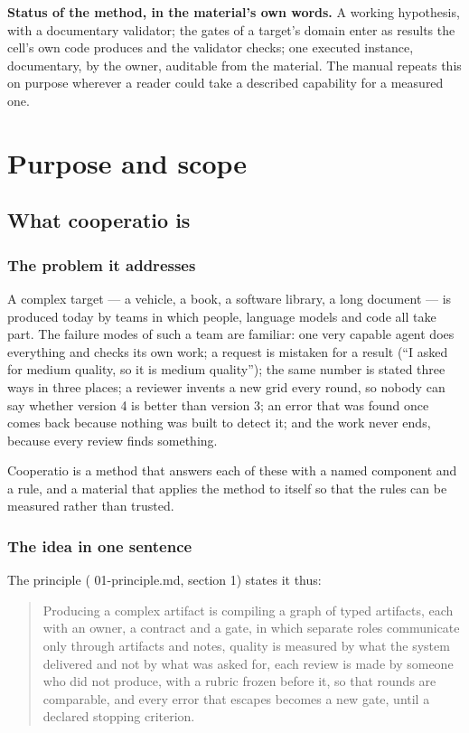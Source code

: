 \documentclass[
  american,
  10pt,
]{report}
\renewcommand{\texttt}[1]{{\ttfamily\hyphenchar\font=-1 #1}}
\begin{document}
\textbf{Status of the method, in the material's own words.} A working
hypothesis, with a documentary validator; the gates of a target's domain
enter as results the cell's own code produces and the validator checks;
one executed instance, documentary, by the owner, auditable from the
material. The manual repeats this on purpose wherever a reader could
take a described capability for a measured one.

\part{Purpose and scope}

\chapter{What cooperatio is}\label{what-cooperatio-is}

\section{The problem it addresses}\label{the-problem-it-addresses}

A complex target --- a vehicle, a book, a software library, a long
document --- is produced today by teams in which people, language models
and code all take part. The failure modes of such a team are familiar:
one very capable agent does everything and checks its own work; a
request is mistaken for a result (``I asked for medium quality, so it is
medium quality''); the same number is stated three ways in three places;
a reviewer invents a new grid every round, so nobody can say whether
version 4 is better than version 3; an error that was found once comes
back because nothing was built to detect it; and the work never ends,
because every review finds something.

Cooperatio is a method that answers each of these with a named component
and a rule, and a material that applies the method to itself so that the
rules can be measured rather than trusted.

\section{The idea in one sentence}\label{the-idea-in-one-sentence}

The principle (\texttt{01-\allowbreak{}principle.\allowbreak{}md},
section 1) states it thus:

\begin{quote}
Producing a complex artifact is compiling a graph of typed artifacts,
each with an owner, a contract and a gate, in which separate roles
communicate only through artifacts and notes, quality is measured by
what the system delivered and not by what was asked for, each review is
made by someone who did not produce, with a rubric frozen before it, so
that rounds are comparable, and every error that escapes becomes a new
gate, until a declared stopping criterion.
\end{quote}
\end{document}
